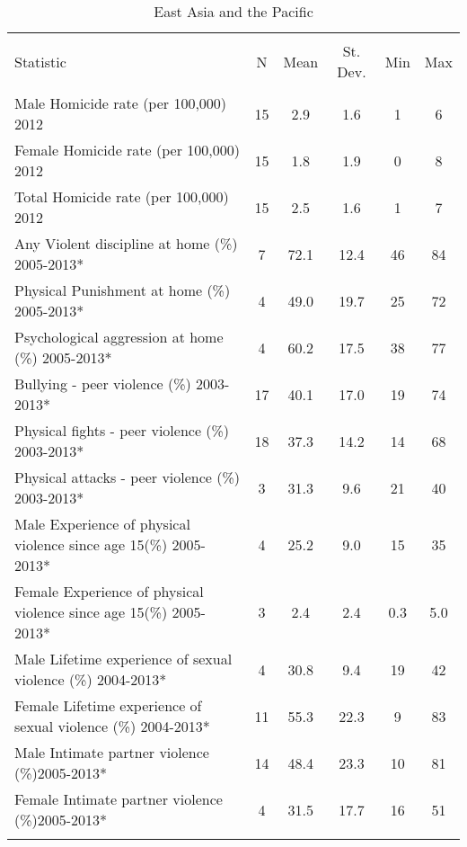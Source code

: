
\begin{table}[!htbp] \centering 
  \caption{East Asia and the Pacific} 
  \label{} 
\begin{tabular}{@{\extracolsep{5pt}}lccccc} 
\\[-1.8ex]\hline 
\hline \\[-1.8ex] 
Statistic & \multicolumn{1}{c}{N} & \multicolumn{1}{c}{Mean} & \multicolumn{1}{c}{St. Dev.} & \multicolumn{1}{c}{Min} & \multicolumn{1}{c}{Max} \\ 
\hline \\[-1.8ex] 
Male Homicide rate (per 100,000) 2012 & 15 & 2.9 & 1.6 & 1 & 6 \\ 
Female Homicide rate (per 100,000)  2012 & 15 & 1.8 & 1.9 & 0 & 8 \\ 
Total Homicide rate (per 100,000)  2012 & 15 & 2.5 & 1.6 & 1 & 7 \\ 
Any Violent discipline at home (\%) 2005-2013* & 7 & 72.1 & 12.4 & 46 & 84 \\ 
Physical Punishment at home (\%) 2005-2013* & 4 & 49.0 & 19.7 & 25 & 72 \\ 
Psychological aggression at home (\%) 2005-2013* & 4 & 60.2 & 17.5 & 38 & 77 \\ 
Bullying - peer violence (\%) 2003-2013* & 17 & 40.1 & 17.0 & 19 & 74 \\ 
Physical fights - peer violence (\%) 2003-2013* & 18 & 37.3 & 14.2 & 14 & 68 \\ 
Physical attacks - peer violence (\%) 2003-2013* & 3 & 31.3 & 9.6 & 21 & 40 \\ 
Male Experience of physical violence since age 15(\%) 2005-2013* & 4 & 25.2 & 9.0 & 15 & 35 \\ 
Female Experience of physical violence since age 15(\%) 2005-2013* & 3 & 2.4 & 2.4 & 0.3 & 5.0 \\ 
Male Lifetime experience of sexual violence (\%) 2004-2013* & 4 & 30.8 & 9.4 & 19 & 42 \\ 
Female Lifetime experience of sexual violence (\%) 2004-2013* & 11 & 55.3 & 22.3 & 9 & 83 \\ 
Male Intimate partner violence (\%)2005-2013* & 14 & 48.4 & 23.3 & 10 & 81 \\ 
Female Intimate partner violence (\%)2005-2013* & 4 & 31.5 & 17.7 & 16 & 51 \\ 
\hline \\[-1.8ex] 
\end{tabular} 
\end{table} 

